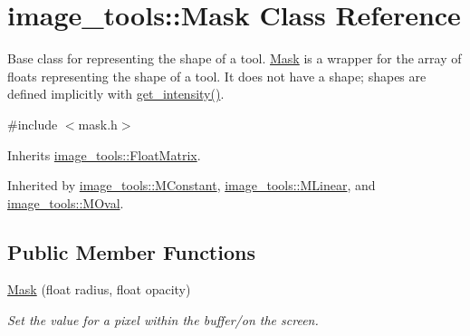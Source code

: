 \hypertarget{classimage__tools_1_1Mask}{}\section{image\+\_\+tools\+:\+:Mask Class Reference}
\label{classimage__tools_1_1Mask}


Base class for representing the shape of a tool. \hyperlink{classimage__tools_1_1Mask}{Mask} is a wrapper for the array of floats representing the shape of a tool. It does not have a shape; shapes are defined implicitly with \hyperlink{classimage__tools_1_1Mask_a72f63a05779159c4f5e2bfea21160c8a}{get\+\_\+intensity()}.  




{\ttfamily \#include $<$mask.\+h$>$}



Inherits \hyperlink{classimage__tools_1_1FloatMatrix}{image\+\_\+tools\+::\+Float\+Matrix}.



Inherited by \hyperlink{classimage__tools_1_1MConstant}{image\+\_\+tools\+::\+M\+Constant}, \hyperlink{classimage__tools_1_1MLinear}{image\+\_\+tools\+::\+M\+Linear}, and \hyperlink{classimage__tools_1_1MOval}{image\+\_\+tools\+::\+M\+Oval}.

\subsection*{Public Member Functions}
\begin{DoxyCompactItemize}
\item 
\hyperlink{classimage__tools_1_1Mask_a5a5cfe28b70dbced61e970f189f83488}{Mask} (float radius, float opacity)\hypertarget{classimage__tools_1_1Mask_a5a5cfe28b70dbced61e970f189f83488}{}\label{classimage__tools_1_1Mask_a5a5cfe28b70dbced61e970f189f83488}

\begin{DoxyCompactList}\small\item\em Set the value for a pixel within the buffer/on the screen. \end{DoxyCompactList}\end{DoxyCompactItemize}
